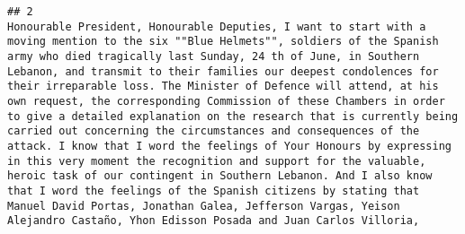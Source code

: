 \documentclass[
]{article}
\begin{document}
\begin{verbatim}
## 2                                                                                                                                                                                                                                                                                                                                                                                                                                                                                                                                                                                                                                                                                                                                                                                                                                                                                                                                                                                                                                                                                                                                                                                                                                                                                                                                                                                                                                                                                                                                                                                                                                                                                                                                                                                                                                                                                                                                                                                                                                                                                                                                                                                                                                                                                                                                                                                                                                                                           Honourable President, Honourable Deputies, I want to start with a moving mention to the six ""Blue Helmets"", soldiers of the Spanish army who died tragically last Sunday, 24 th of June, in Southern Lebanon, and transmit to their families our deepest condolences for their irreparable loss. The Minister of Defence will attend, at his own request, the corresponding Commission of these Chambers in order to give a detailed explanation on the research that is currently being carried out concerning the circumstances and consequences of the attack. I know that I word the feelings of Your Honours by expressing in this very moment the recognition and support for the valuable, heroic task of our contingent in Southern Lebanon. And I also know that I word the feelings of the Spanish citizens by stating that Manuel David Portas, Jonathan Galea, Jefferson Vargas, Yeison Alejandro Castaño, Yhon Edisson Posada and Juan Carlos Villoria, 
\end{verbatim}
\end{document}
